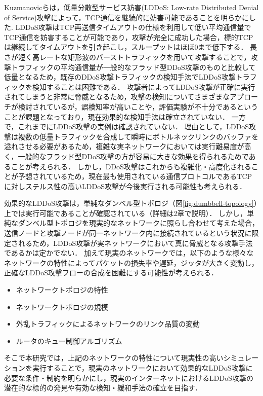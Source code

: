 \documentclass[Japanese]{dicomopapers}
\begin{document}
Kuzmanovicらは，低量分散型サービス妨害(LDDoS: Low-rate Distributed Denial of Service)攻撃によって，TCP通信を継続的に妨害可能であることを明らかにした\cite{ldos}.
LDDoS攻撃はTCP再送信タイムアウトの仕様を利用して低い平均通信量でTCP通信を妨害することが可能であり，攻撃が完全に成功した場合，標的TCPは継続してタイムアウトを引き起こし，スループットはほぼ0まで低下する．
長さが短く高レートな矩形波のバーストトラフィックを用いて攻撃することで，攻撃トラフィックの平均通信量が一般的なフラッド型DDoS攻撃のものと比較して低量となるため，既存のDDoS攻撃トラフィックの検知手法でLDDoS攻撃トラフィックを検知することは困難である．
攻撃者によってLDDoS攻撃が正確に実行されてしまうと非常に脅威となるため，攻撃の検知についてさまざまなアプローチ\cite{cpr1}\cite{cpr2}\cite{entropy1}が検討されているが，誤検知率が高いことや，評価実験が不十分であるということが課題となっており，現在効果的な検知手法は確立されていない．
一方で，これまでにLDDoS攻撃の実例は確認されていない．
理由として，LDDoS攻撃は複数の低量トラフィックを合成して瞬時にボトルネックリンクのバッファを溢れさせる必要があるため，複雑な実ネットワークにおいては実行難易度が高く，一般的なフラッド型DDoS攻撃の方が容易に大きな効果を得られるためであることが考えられる．
しかし，DDoS攻撃はこれからも複雑化・高度化されることが予想されているため\cite{cdn}，現在最も使用されている通信プロトコルであるTCPに対しステルス性の高いLDDoS攻撃が今後実行される可能性も考えられる．

効果的なLDDoS攻撃は，単純なダンベル型トポロジ（図\ref{fig:dumbbell-topology}）上では実行可能であることが確認されている（詳細は2章で説明）．
しかし，単純なダンベル型トポロジを現実的なネットワークに照らし合わせて考えた場合，送信ノードと攻撃ノードが同一ネットワーク内に接続されているという状況に限定されるため，LDDoS攻撃が実ネットワークにおいて真に脅威となる攻撃手法であるかは定かでない．
加えて現実のネットワークでは，以下のような様々なネットワークの特性によってパケットの損失率や遅延，ジッタが大きく変動し，正確なLDDoS攻撃フローの合成を困難にする可能性が考えられる．

\begin{itemize}
    \item ネットワークトポロジの特性
    \item ネットワークトポロジの規模
    \item 外乱トラフィックによるネットワークのリンク品質の変動
    \item ルータのキュー制御アルゴリズム
\end{itemize}

そこで本研究では，上記のネットワークの特性について現実性の高いシミュレーションを実行することで，現実のネットワークにおいて効果的なLDDoS攻撃に必要な条件・制約を明らかにし，現実のインターネットにおけるLDDoS攻撃の潜在的な標的の発見や有効な検知・緩和手法の確立を目指す．
\end{document}
